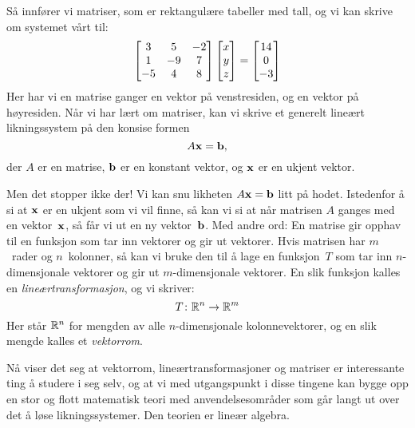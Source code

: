 Så innfører vi matriser, som er rektangulære tabeller med tall, og vi
kan skrive om systemet vårt til:
\[
\begin{bmatrix}
 3 &  5 & -2 \\
 1 & -9 &  7 \\
-5 &  4 &  8
\end{bmatrix}
\begin{bmatrix} x \\ y \\ z \end{bmatrix}
= \begin{bmatrix} 14 \\ 0 \\ -3 \end{bmatrix}
\]
Her har vi en matrise ganger en vektor på venstresiden, og en vektor
på høyresiden.  Når vi har lært om matriser, kan vi skrive et generelt
lineært likningssystem på den konsise formen
\[
A \mathbf{x} = \mathbf{b},
\]
der $A$ er en matrise, $\mathbf{b}$ er en konstant vektor, og $\mathbf{x}$ er en
ukjent vektor.

Men det stopper ikke der!  Vi kan snu likheten $A \mathbf{x} = \mathbf{b}$ litt
på hodet.  Istedenfor å si at $\mathbf{x}$ er en ukjent som vi vil finne,
så kan vi si at når matrisen $A$ ganges med en vektor~$\mathbf{x}$, så får
vi ut en ny vektor~$\mathbf{b}$.  Med andre ord: En matrise gir opphav til
en funksjon som tar inn vektorer og gir ut vektorer.  Hvis matrisen
har $m$~rader og $n$~kolonner, så kan vi bruke den til å lage en
funksjon~$T$ som tar inn $n$-dimensjonale vektorer og gir ut
$m$-dimensjonale vektorer.  En slik funksjon kalles en
\emph{lineærtransformasjon}, og vi skriver:
\[
T \colon \mathbb{R}^n \to \mathbb{R}^m
\]
Her står $\mathbb{R}^n$ for mengden av alle $n$-dimensjonale kolonnevektorer,
og en slik mengde kalles et \emph{vektorrom}.

Nå viser det seg at vektorrom, lineærtransformasjoner og matriser er
interessante ting å studere i seg selv, og at vi med utgangspunkt i
disse tingene kan bygge opp en stor og flott matematisk teori med
anvendelsesområder som går langt ut over det å løse likningssystemer.
Den teorien er lineær algebra.






